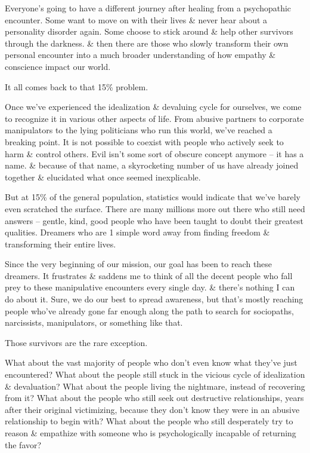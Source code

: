 \documentclass{article}
\numberwithin{equation}{section}
\begin{document}
Everyone's going to have a different journey after healing from a psychopathic encounter. Some want to move on with their lives \& never hear about a personality disorder again. Some choose to stick around \& help other survivors through the darkness. \& then there are those who slowly transform their own personal encounter into a much broader understanding of how empathy \& conscience impact our world.

It all comes back to that 15\% problem.

Once we've experienced the idealization \& devaluing cycle for ourselves, we come to recognize it in various other aspects of life. From abusive partners to corporate manipulators to the lying politicians who run this world, we've reached a breaking point. It is not possible to coexist with people who actively seek to harm \& control others. Evil isn't some sort of obscure concept anymore -- it has a name. \& because of that name, a skyrocketing number of us have already joined together \& elucidated what once seemed inexplicable.

But at 15\% of the general population, statistics would indicate that we've barely even scratched the surface. There are many millions more out there who still need answers -- gentle, kind, good people who have been taught to doubt their greatest qualities. Dreamers who are 1 simple word away from finding freedom \& transforming their entire lives.

Since the very beginning of our mission, our goal has been to reach these dreamers. It frustrates \& saddens me to think of all the decent people who fall prey to these manipulative encounters every single day. \& there's nothing I can do about it. Sure, we do our best to spread awareness, but that's mostly reaching people who've already gone far enough along the path to search for sociopaths, narcissists, manipulators, or something like that.

Those survivors are the rare exception.

What about the vast majority of people who don't even know what they've just encountered? What about the people still stuck in the vicious cycle of idealization \& devaluation? What about the people living the nightmare, instead of recovering from it? What about the people who still seek out destructive relationships, years after their original victimizing, because they don't know they were in an abusive relationship to begin with? What about the people who still desperately try to reason \& empathize with someone who is psychologically incapable of returning the favor?
\end{document}
